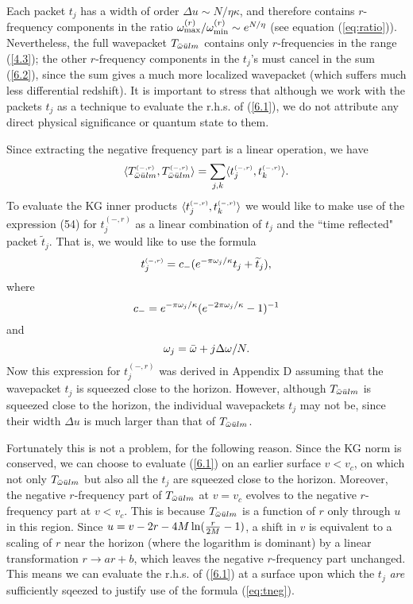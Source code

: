 Each packet $t_j$ has a width of order $\Delta u\sim N/\eta\kappa$,
and therefore contains $r$-frequency components in the ratio
$\omega^{(r)}_{\rm max}/\omega^{(r)}_{\rm min}\sim e^{N/\eta}$ (see equation
(\ref{eq:ratio})). Nevertheless, the full wavepacket
$T_{\bar{\omega}\bar{u} lm}$
contains only $r$-frequencies in the range (\ref{4.3});
the other $r$-frequency components in the $t_j$'s must
cancel in the sum
(\ref{6.2}), since the sum gives a much more localized wavepacket
(which suffers much less differential redshift).
It is important to stress that although we work with the packets
$t_j$ as a technique to evaluate the r.h.s. of (\ref{6.1}), we do
not attribute any direct physical significance or quantum
state to them.

Since extracting the negative frequency part is a linear
operation, we have
\begin{equation} \langle T^{\scriptscriptstyle(-,r)}_{\bar{\omega}\bar{u} lm},
T^{\scriptscriptstyle(-,r)}_{\bar{\omega}\bar{u} lm}\rangle=
\sum_{j,k}\langle t^{\scriptscriptstyle (-,r)}_j,
t^{\scriptscriptstyle (-,r)}_k\rangle.
\label{6.4}
\end{equation}
To evaluate the KG inner products
$\langle t^{\scriptscriptstyle (-,r)}_j,
t^{\scriptscriptstyle (-,r)}_k\rangle$
we would like to make use of the expression (54) for
$t^{\scriptscriptstyle (-,r)}_j$ as a linear combination of
$t_j$ and the ``time reflected" packet $\widetilde {t}_j$.
That is, we would like to use the formula
\begin{equation}
t^{\scriptscriptstyle(-,r)}_j=c_{-}
(e^{-\pi\omega_j/\kappa}t_j+\widetilde{t}_j),
\label{eq:tneg}
\end{equation}
where
\begin{equation}
c_{-}=
e^{-\pi\omega_j/\kappa}(e^{-2\pi\omega_j/\kappa}-1)^{-1}
\end{equation}
and
\begin{equation}
\omega_j=\bar{\omega}+j\Delta\omega/N.
\end{equation}
Now this expression for $t^{\scriptscriptstyle(-,r)}_j$
was derived in Appendix D assuming that the wavepacket
$t_j$ is squeezed close to the horizon. However, although
$T_{\bar{\omega}\bar{u} lm}$ is squeezed close to the horizon, the
individual wavepackets $t_j$ may not be, since their width
$\Delta u$ is much larger than that of $T_{\bar{\omega}\bar{u} lm}$.

Fortunately this is not a problem, for the following reason.
Since the KG norm is conserved, we can choose to evaluate
(\ref{6.1}) on an earlier surface $v<v_c$, on which not only
$T_{\bar{\omega}\bar{u} lm}$ but also all the $t_j$ are squeezed
close to the horizon. Moreover, the negative $r$-frequency
part of $T_{\bar{\omega}\bar{u} lm}$ at $v=v_c$ evolves to the
negative $r$-frequency part at $v<v_c$. This is because
$T_{\bar{\omega}\bar{u} lm}$ is a function of $r$ only through $u$
in this region. Since $u=v-2r-4M\ln({r\over 2M}-1)$,
a shift in $v$ is equivalent to a scaling of $r$ near the
horizon (where the logarithm is dominant)
by a linear transformation $r\rightarrow ar+b$,
which leaves the negative
$r$-frequency part unchanged. This means we can evaluate the
r.h.s. of (\ref{6.1}) at a surface upon which the $t_j$ {\it are}
sufficiently sqeezed to justify use of the formula
(\ref{eq:tneg}).

